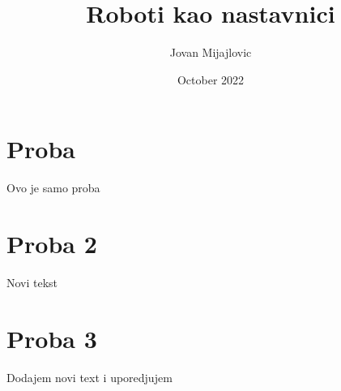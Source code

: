 \documentclass[]{article}
\title{Roboti kao nastavnici}
\author{Jovan Mijajlovic}
\date{October 2022}
\begin{document}
\maketitle

\section{Proba}
\begin{center}
    Ovo je samo proba
\end{center}

\section{Proba 2}
\begin{center}
    Novi tekst
\end{center}

\section{Proba 3}
\begin{center}
    Dodajem novi text i uporedjujem
\end{center}
\end{document}
